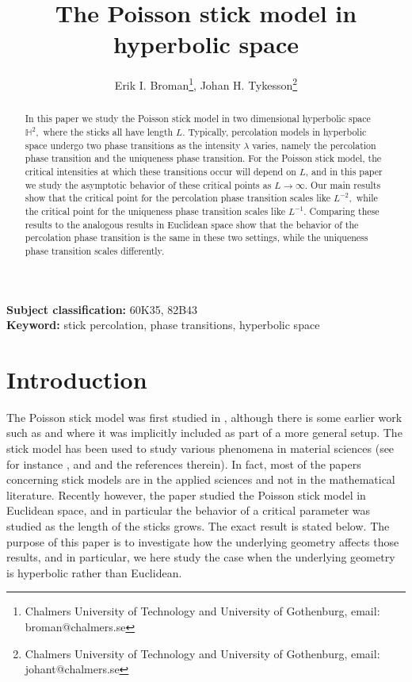 \documentclass[a4paper,12pt]{article}
\newcommand{\BH}{{\mathbb{H}}}
\begin{document}
 
\title{The Poisson stick model in hyperbolic space}
\author{Erik I. Broman\footnote{Chalmers University of Technology and University of Gothenburg, email: broman@chalmers.se}, Johan H. Tykesson\footnote{Chalmers University of Technology and University of Gothenburg, email: johant@chalmers.se}}
\maketitle

\begin{abstract}
In this paper we study the Poisson stick model in two dimensional hyperbolic space 
$\BH^2,$ where the sticks all have length $L.$
Typically, percolation models in hyperbolic space 
undergo two phase transitions as the intensity $\lambda$ varies, namely the percolation phase 
transition and the uniqueness phase transition. For the Poisson stick model, 
the critical intensities at which these transitions
occur will depend on $L$, and in this paper we study the asymptotic behavior of these critical points 
as $L\to \infty.$ Our main results show that the critical point for the percolation phase transition 
scales like $L^{-2},$ while the critical point for the uniqueness phase transition 
scales like $L^{-1}.$ Comparing these results to the analogous results in Euclidean space show that 
the behavior of the percolation phase transition is the same in these two settings, while 
the uniqueness phase transition scales differently. 
\end{abstract}

\noindent
{\bf Subject classification:} 60K35, 82B43 \\
{\bf Keyword:} stick percolation, phase transitions, hyperbolic space







\section{Introduction}
The Poisson stick model was first studied in \cite{R_91}, although there is some earlier work
such as \cite{DK_84} and \cite{H_85} where it was implicitly included as part of a more general setup. 
The stick model has 
been used to study various phenomena in material sciences (see for instance \cite{MNT_14}, \cite{SKKSW_03}
and \cite{TE_19} and the references therein). In fact, most of the papers concerning stick models 
are in the applied sciences
and not in the mathematical literature. Recently however, the paper \cite{B_22} studied the Poisson stick 
model in Euclidean space, and in particular the behavior of a critical parameter was studied 
as the length of the sticks grows. The exact result is stated below. The purpose of this paper is to 
investigate how the underlying geometry affects those results, and in particular, we here study 
the case when the underlying geometry is hyperbolic rather than Euclidean.
\end{document}
